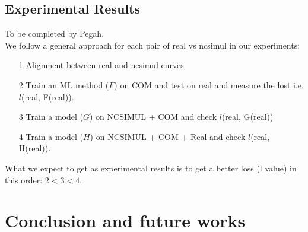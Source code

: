 \documentclass{article}
\begin{document}
\subsection{Experimental Results}
To be completed by Pegah. \\
We follow a general approach for each pair of real vs ncsimul in our experiments:
\begin{itemize}
\item[1] Alignment between real and ncsimul curves
\item[2] Train an ML method ($F$) on COM and test on real and measure the lost i.e. $l$(real, F(real)).
\item[3] Train a model ($G$) on NCSIMUL + COM and check $l$(real, G(real))
\item[4] Train a model ($H$) on NCSIMUL + COM + Real and check $l$(real, H(real)).
\end{itemize}
What we expect to get as experimental results is to get a better loss (l value) in this order: $2 < 3 < 4$. 
\section{Conclusion and future works}
\end{document}
